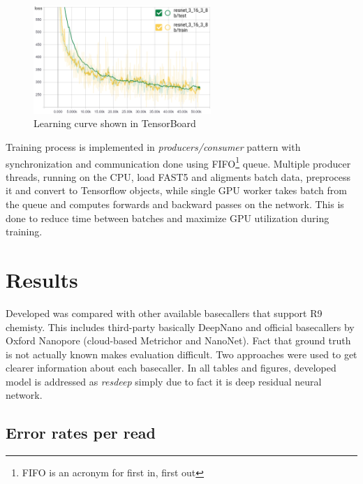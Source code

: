 \documentclass[times, utf8, diplomski, numeric, english]{fer}
\begin{document}
\begin{figure}[!ht]
	\begin{center}
		\includegraphics[width=0.6\textwidth]{./imgs/train_tb.png}
		\caption{Learning curve shown in TensorBoard}
		\label{fg:learn}
	\end{center}
\end{figure}

Training process is implemented in \textit{producers/consumer} pattern with synchronization and communication done using FIFO\footnote{FIFO is an acronym for first in, first out} queue. Multiple producer threads, running on the CPU, load FAST5 and aligments batch data, preprocess it and convert to Tensorflow objects, while single GPU worker takes batch from the queue and computes forwards and backward passes on the network. This is done to reduce time between batches and maximize GPU utilization during training. 












\chapter{Results}
Developed was compared with other available basecallers that support R9 chemisty. This includes third-party basically DeepNano and official basecallers by Oxford Nanopore (cloud-based Metrichor and NanoNet).
Fact that ground truth is not actually known makes evaluation difficult. Two approaches were used to get clearer information about each basecaller.
In all tables and figures, developed model is addressed as \textit{resdeep} simply due to fact it is deep residual neural network.



\section{Error rates per read}
\end{document}
